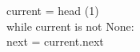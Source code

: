 \documentclass[preview]{standalone}
\begin{document}
current = head (1)\\while current is not None:\\next = current.next\\
\end{document}
